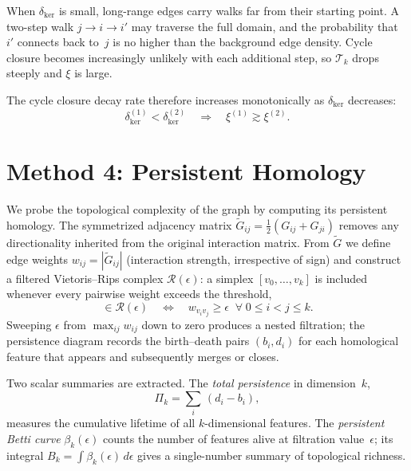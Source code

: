\documentclass[11pt]{article}
\begin{document}
When $\delta_{\mathrm{ker}}$ is small, long-range edges carry walks
far from their starting point.  A two-step walk $j\to i\to i'$ may
traverse the full domain, and the probability that $i'$ connects back
to~$j$ is no higher than the background edge density.  Cycle closure
becomes increasingly unlikely with each additional step, so
$\mathcal{T}_k$ drops steeply and $\xi$ is large.

The cycle closure decay rate therefore increases monotonically as
$\delta_{\mathrm{ker}}$ decreases:
\begin{equation}
  \delta_{\mathrm{ker}}^{(1)} < \delta_{\mathrm{ker}}^{(2)}
  \quad\Longrightarrow\quad
  \xi^{(1)} \gtrsim \xi^{(2)}.
  \label{eq:xi_monotone}
\end{equation}

\section{Method 4: Persistent Homology}
\label{sec:persistent_homology}

We probe the topological complexity of the graph by computing its
persistent homology.  The symmetrized adjacency matrix
$\tilde{G}_{ij}=\tfrac{1}{2}(G_{ij}+G_{ji})$ removes any
directionality inherited from the original interaction matrix.  From
$\tilde{G}$ we define edge weights $w_{ij}=|\tilde{G}_{ij}|$
(interaction strength, irrespective of sign) and construct a filtered
Vietoris--Rips complex $\mathcal{R}(\epsilon)$: a simplex
$[v_0,\dots,v_k]$ is included whenever every pairwise weight exceeds
the threshold,
\begin{equation}
  [v_0,\dots,v_k]\in\mathcal{R}(\epsilon)
  \quad\Longleftrightarrow\quad
  w_{v_i v_j}\geq\epsilon
  \;\;\forall\;0\leq i<j\leq k.
  \label{eq:rips}
\end{equation}
Sweeping $\epsilon$ from $\max_{ij}w_{ij}$ down to zero produces a
nested filtration; the persistence diagram records the birth--death
pairs $(b_i,d_i)$ for each homological feature that appears and
subsequently merges or closes.

Two scalar summaries are extracted.  The \emph{total persistence} in
dimension~$k$,
\begin{equation}
  \Pi_k = \sum_{i}\,(d_i - b_i),
  \label{eq:total_persistence}
\end{equation}
measures the cumulative lifetime of all $k$-dimensional features.
The \emph{persistent Betti curve} $\beta_k(\epsilon)$ counts the
number of features alive at filtration value~$\epsilon$; its integral
$B_k = \int \beta_k(\epsilon)\,d\epsilon$ gives a single-number
summary of topological richness.
\end{document}
